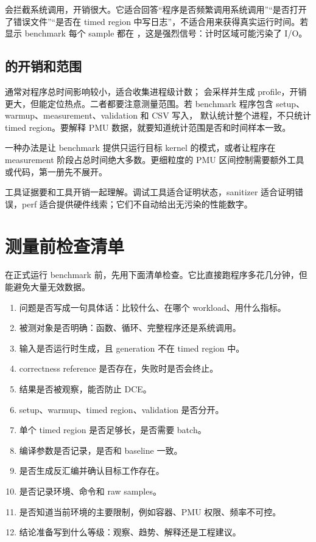  会拦截系统调用，开销很大。它适合回答“程序是否频繁调用系统调用”“是否打开了错误文件”“是否在 timed region 中写日志”，不适合用来获得真实运行时间。若  显示 benchmark 每个 sample 都在 ，这是强烈信号：计时区域可能污染了 I/O。

\subsection{ 的开销和范围}

 通常对程序总时间影响较小，适合收集进程级计数； 会采样并生成 profile，开销更大，但能定位热点。二者都要注意测量范围。若 benchmark 程序包含 setup、warmup、measurement、validation 和 CSV 写入， 默认统计整个进程，不只统计 timed region。要解释 PMU 数据，就要知道统计范围是否和时间样本一致。

一种办法是让 benchmark 提供只运行目标 kernel 的模式，或者让程序在 measurement 阶段占总时间绝大多数。更细粒度的 PMU 区间控制需要额外工具或代码，第一册先不展开。

\begin{warningbox}
工具证据要和工具开销一起理解。调试工具适合证明状态，sanitizer 适合证明错误，perf 适合提供硬件线索；它们不自动给出无污染的性能数字。
\end{warningbox}

\section{测量前检查清单}

在正式运行 benchmark 前，先用下面清单检查。它比直接跑程序多花几分钟，但能避免大量无效数据。

\begin{enumerate}
  \item 问题是否写成一句具体话：比较什么、在哪个 workload、用什么指标。
  \item 被测对象是否明确：函数、循环、完整程序还是系统调用。
  \item 输入是否运行时生成，且 generation 不在 timed region 中。
  \item correctness reference 是否存在，失败时是否会终止。
  \item 结果是否被观察，能否防止 DCE。
  \item setup、warmup、timed region、validation 是否分开。
  \item 单个 timed region 是否足够长，是否需要 batch。
  \item 编译参数是否记录，是否和 baseline 一致。
  \item 是否生成反汇编并确认目标工作存在。
  \item 是否记录环境、命令和 raw samples。
  \item 是否知道当前环境的主要限制，例如容器、PMU 权限、频率不可控。
  \item 结论准备写到什么等级：观察、趋势、解释还是工程建议。
\end{enumerate}

